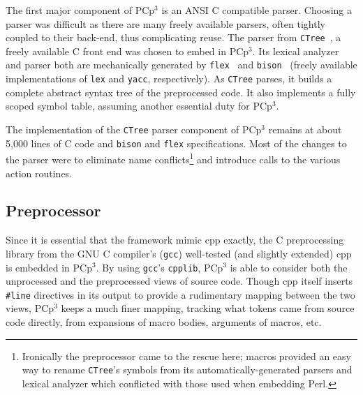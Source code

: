 \documentclass{article}
\newcommand{\pcp}{\mbox{\textsf{PCp}$^3$}}
\newcommand{\Cpp}{\mbox{\textsf{cpp}}}
\newcommand{\Perl}{\mbox{\textsf{Perl}}}
\newcommand{\C}{\mbox{\textsf{C}}}
\newcommand{\ppd}[1]{\texttt{\##1}}
\newcommand{\etc}{etc}  %
\begin{document}
The first major component of \pcp{} is an ANSI \C{} compatible parser.
Choosing a parser was difficult as there are many freely available
parsers, often tightly coupled to their back-end, thus complicating
reuse.  The parser from \texttt{CTree}~\cite{CTree}, a freely available
\C{} front end was chosen to embed in \pcp{}.  Its lexical analyzer and
parser both are mechanically generated by
\texttt{flex}~\cite{Flex,Levine92} and
\texttt{bison}~\cite{Bison,Levine92} (freely available implementations
of \texttt{lex} and \texttt{yacc}, respectively).  
As \texttt{CTree} parses, it builds a complete abstract syntax tree of
the preprocessed code.  It also implements a fully scoped symbol table,
assuming another essential duty for \pcp{}.

The implementation of the \texttt{CTree} parser component of \pcp{}
remains at about 5,000 lines of \C{} code and \texttt{bison} and
\texttt{flex} specifications.  Most of the changes to the parser were to
eliminate name conflicts\footnote{Ironically the preprocessor came to the
  rescue here; macros provided an easy way to rename \texttt{CTree}'s
  symbols from its automatically-generated parsers and lexical analyzer
  which conflicted with those used when embedding \Perl{}.}  and
introduce calls to the various action routines.

\subsection{Preprocessor}


Since it is essential that the framework mimic \Cpp{}
exactly, the \C{} preprocessing library from the GNU \C{}
compiler's (\texttt{gcc}) well-tested (and slightly extended)
\Cpp{}~\cite{GCC} is embedded in \pcp{}.  By using \texttt{gcc}'s
\texttt{cpplib}, \pcp{} is able to consider both the unprocessed and
the preprocessed views of source code.  Though \Cpp{} itself inserts
\ppd{line} directives in its output to provide a rudimentary mapping
between the two views, \pcp{} keeps a much finer mapping, tracking
what tokens came from source code directly, from expansions of macro
bodies, arguments of macros, \etc.
\end{document}
